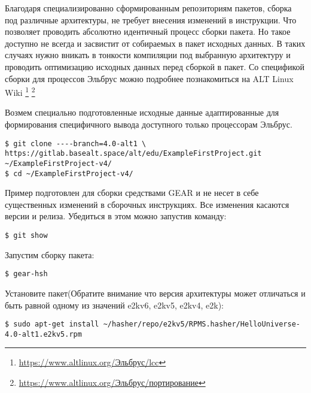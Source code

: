 
Благодаря специализированно сформированным репозиториям пакетов, сборка
под различные архитектуры, не требует внесения изменений в инструкции.
Что позволяет проводить абсолютно идентичный процесс сборки пакета.
Но такое доступно не всегда и засвистит от собираемых в пакет исходных данных.
В таких случаях нужно вникать в тонкости компиляции под выбранную архитектуру
и проводить оптимизацию исходных данных перед сборкой в пакет.
Со спецификой сборки для процессов Эльбрус можно подробнее познакомиться
на ALT Linux Wiki%
\footnote{\href{https://www.altlinux.org/\%D0\%AD\%D0\%BB\%D1\%8C\%D0\%B1\%D1\%80\%D1\%83\%D1\%81/lcc}{https://www.altlinux.org/Эльбрус/lcc}}%
\footnote{\href{https://www.altlinux.org/\%D0\%AD\%D0\%BB\%D1\%8C\%D0\%B1\%D1\%80\%D1\%83\%D1\%81/\%D0\%BF\%D0\%BE\%D1\%80\%D1\%82\%D0\%B8\%D1\%80\%D0\%BE\%D0\%B2\%D0\%B0\%D0\%BD\%D0\%B8\%D0\%B5}{https://www.altlinux.org/Эльбрус/портирование}}

Возмем специально подготовленные исходные данные адаптированные для
формирования специфичного вывода доступного только процессорам Эльбрус.

\begin{verbatim}
$ git clone ----branch=4.0-alt1 \
https://gitlab.basealt.space/alt/edu/ExampleFirstProject.git ~/ExampleFirstProject-v4/
$ cd ~/ExampleFirstProject-v4/
\end{verbatim}

Пример подготовлен для сборки средствами GEAR и не несет в себе существенных
изменений в сборочных инструкциях. Все изменения касаются версии и релиза.
Убедиться в этом можно запустив команду:
\begin{verbatim}
$ git show
\end{verbatim}

Запустим сборку пакета:
\begin{verbatim}
$ gear-hsh
\end{verbatim}

Установите пакет(Обратите внимание что версия архитектуры может отличаться и быть равной одному из значений e2kv6, e2kv5, e2kv4, e2k):
\begin{verbatim}
$ sudo apt-get install ~/hasher/repo/e2kv5/RPMS.hasher/HelloUniverse-4.0-alt1.e2kv5.rpm
\end{verbatim}

